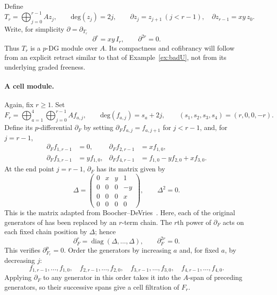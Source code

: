 \documentclass[11pt]{article}
\theoremstyle{definition}
\numberwithin{equation}{section}
\begin{document}
Define
\begin{equation}\label{eq:gap-Tr}
 T_r=\bigoplus_{j=0}^{r-1}Az_j,\qquad \mathrm{deg}(z_j)=2j,\qquad
 \partial z_j=z_{j+1}\ (j<r-1),\quad
 \partial z_{r-1}=xy\,z_0.
\end{equation}
Write, for simplicity $\partial=\partial_{T_r}$
\begin{equation}\label{eq:gap-cycle-powers}
 \partial^{r}=xy\,I_r,\qquad
 \partial^{2r}=0.
\end{equation}
Thus $T_r$ is a $p$-DG module over $A$.  Its compactness and cofibrancy will follow
from an explicit retract similar to that of Example~\ref{ex:badU}, not from its underlying graded freeness.

\paragraph{A cell module.}
Again, fix $r\geq 1$. Set
\[
 F_r=\bigoplus_{a=1}^4\bigoplus_{j=0}^{r-1}Af_{a,j},\qquad
 \mathrm{deg}(f_{a,j})=s_a+2j,\qquad(s_1,s_2,s_3,s_4)=(r,0,0,-r).
\]
Define its $p$-differential $\partial_F$ by setting $\partial_F f_{a,j}=f_{a,j+1}$ for $j<r-1$, and, for $j=r-1$,
\begin{equation}\label{eq:gap-endpoints}
\begin{aligned}
 \partial_F f_{1,r-1}&=0,&
 \partial_F f_{2,r-1}&=xf_{1,0},\\
 \partial_F f_{3,r-1}&=yf_{1,0},&
 \partial_F f_{4,r-1}&=f_{1,0}-yf_{2,0}+xf_{3,0}.
\end{aligned}
\end{equation}
At the end point $j=r-1$, $\partial_F$ has its matrix given by
\begin{equation}\label{eq:gap-Delta}
 \Delta=\begin{pmatrix}
 0&x&y&1\\
 0&0&0&-y\\
 0&0&0&x\\
 0&0&0&0
 \end{pmatrix},\qquad \Delta^2=0.
\end{equation}
This is the matrix adapted from Boocher--DeVries~\cite[Example 3.3]{BoocherDeVries}.  Here, each of the original generators of \cite[Example 3.3]{BoocherDeVries} has been
replaced by an $r$-term chain.  The $r$th power of $\partial_{F}$ acts
on each fixed chain position by $\Delta$; hence
\[
 \partial_{F}^{r}=\operatorname{diag}(\Delta,\ldots,\Delta),\qquad
 \partial_{F}^{2r}=0.
\]
This verifies $\partial_{F_r}^p=0$.  Order the generators by increasing
$a$ and, for fixed $a$, by decreasing $j$:
\begin{equation}\label{eq:gap-cell-order}
 f_{1,r-1},\ldots,f_{1,0},\quad
 f_{2,r-1},\ldots,f_{2,0},\quad
 f_{3,r-1},\ldots,f_{3,0},\quad
 f_{4,r-1},\ldots,f_{4,0}.
\end{equation}
Applying $\partial_F$ to any generator in this order takes it into the $A$-span of preceding generators, so their
successive spans give a cell filtration of $F_r$.
\end{document}
